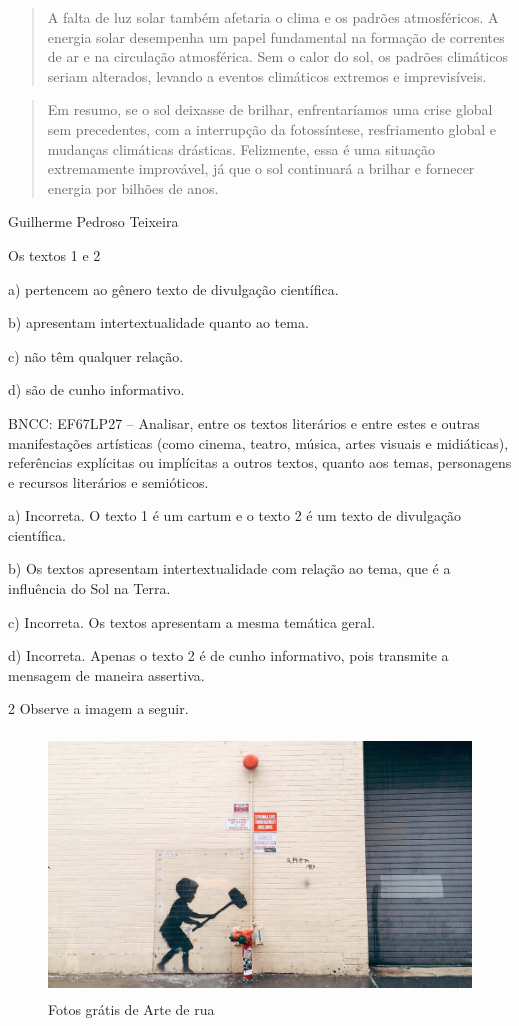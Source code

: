 {\begin{quote}
A falta de luz solar também afetaria o clima e os padrões atmosféricos.
A energia solar desempenha um papel fundamental na formação de correntes
de ar e na circulação atmosférica. Sem o calor do sol, os padrões
climáticos seriam alterados, levando a eventos climáticos extremos e
imprevisíveis.
\end{quote}

\begin{quote}
Em resumo, se o sol deixasse de brilhar, enfrentaríamos uma crise global
sem precedentes, com a interrupção da fotossíntese, resfriamento global
e mudanças climáticas drásticas. Felizmente, essa é uma situação
extremamente improvável, já que o sol continuará a brilhar e fornecer
energia por bilhões de anos.
\end{quote}

Guilherme Pedroso Teixeira

Os textos 1 e 2

a) pertencem ao gênero texto de divulgação científica.

b) apresentam intertextualidade quanto ao tema.

c) não têm qualquer relação.

d) são de cunho informativo.

BNCC: EF67LP27 -- Analisar, entre os textos literários e entre estes e
outras manifestações artísticas (como cinema, teatro, música, artes
visuais e midiáticas), referências explícitas ou implícitas a outros
textos, quanto aos temas, personagens e recursos literários e
semióticos.

a) Incorreta. O texto 1 é um cartum e o texto 2 é um texto de divulgação
científica.

b) Os textos apresentam intertextualidade com relação ao tema, que é a
influência do Sol na Terra.

c) Incorreta. Os textos apresentam a mesma temática geral.

d) Incorreta. Apenas o texto 2 é de cunho informativo, pois transmite a
mensagem de maneira assertiva.

\num{2} Observe a imagem a seguir.

\begin{figure}
\centering
\includegraphics[width=4.69016in,height=2.73611in]{./imgSAEB_6_POR/media/image13.jpeg}
\caption{Fotos grátis de Arte de rua}
\end{figure}

}
